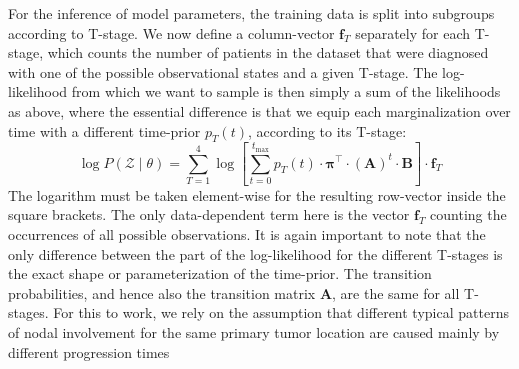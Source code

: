 \documentclass[\relativeRoot/main.tex]{subfiles}
\begin{document}
For the inference of model parameters, the training data is split into subgroups according to T-stage. We now define a column-vector $\mathbf{f}_T$ separately for each T-stage, which counts the number of patients in the dataset that were diagnosed with one of the possible observational states and a given T-stage. The log-likelihood from which we want to sample is then simply a sum of the likelihoods as above, where the essential difference is that we equip each marginalization over time with a different time-prior $p_T (t)$, according to its T-stage:
%
\begin{equation} \label{eq:hmm_log_likelihood}
    \log{P \left( \boldsymbol{\mathcal{Z}} \mid \theta \right)} = \sum_{T=1}^{4}{\log{\left[ \sum_{t = 0}^{t_\text{max}}{p_T (t) \cdot \boldsymbol{\pi}^\top \cdot (\mathbf{A})^t \cdot \mathbf{B}} \right]} \cdot \mathbf{f}_T}
\end{equation}
%
The logarithm must be taken element-wise for the resulting row-vector inside the square brackets. The only data-dependent term here is the vector $\mathbf{f}_T$ counting the occurrences of all possible observations. It is again important to note that the only difference between the part of the log-likelihood for the different T-stages is the exact shape or parameterization of the time-prior. The transition probabilities, and hence also the transition matrix $\mathbf{A}$, are the same for all T-stages. For this to work, we rely on the assumption that different typical patterns of nodal involvement for the same primary tumor location are caused mainly by different progression times
\end{document}
